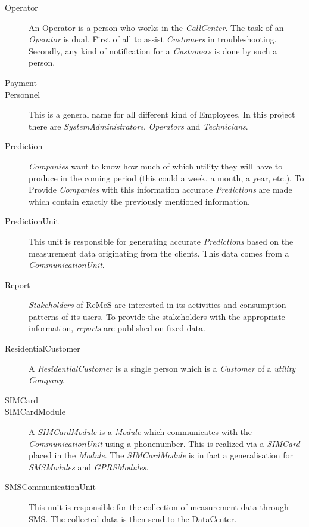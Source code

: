 \begin{description}
\item[Operator] An Operator is a person who works in the \emph{CallCenter}. The
task of an \emph{Operator} is dual. First of all to assist \emph{Customers} in
troubleshooting. Secondly, any kind of notification for a \emph{Customers} is
done by such a person.

\item[Payment] %

\item[Personnel] This is a general name for all different kind of Employees. In
this project there are \emph{SystemAdministrators}, \emph{Operators} and
\emph{Technicians}.

\item[Prediction] \emph{Companies} want to know how much of which utility they
will have to produce in the coming period (this could a week, a month, a year,
etc.). To Provide \emph{Companies} with this information accurate
\emph{Predictions} are made which contain exactly the previously mentioned
information.

\item[PredictionUnit] This unit is responsible for generating accurate
\emph{Predictions} based on the measurement data originating from the clients.
This data comes from a \emph{CommunicationUnit}.

\item[Report] \emph{Stakeholders} of ReMeS are interested in its activities and
consumption patterns of its users. To provide the stakeholders with the
appropriate information, \emph{reports} are published on fixed data.

\item[ResidentialCustomer] A \emph{ResidentialCustomer} is a single person which
is a \emph{Customer} of a \emph{utility} \emph{Company}. 

\item[SIMCard] %

\item[SIMCardModule] A \emph{SIMCardModule} is a \emph{Module} which
communicates with the \emph{CommunicationUnit} using a phonenumber. This is
realized via a \emph{SIMCard} placed in the \emph{Module}. The
\emph{SIMCardModule} is in fact a generalisation for \emph{SMSModules} and
\emph{GPRSModules}.

\item[SMSCommunicationUnit] This unit is responsible for the collection of
measurement data through SMS. The collected data is then send to the DataCenter.


\end{description}
